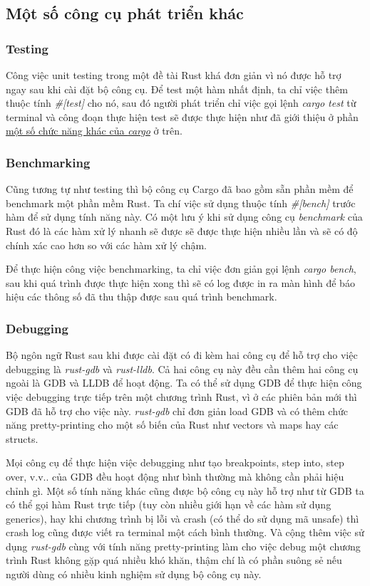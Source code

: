 \subsection{Một số công cụ phát triển khác}
\subsubsection{Testing}
Công việc unit testing trong một đề tài Rust khá đơn giản vì nó được hỗ trợ ngay sau khi cài đặt bộ công cụ.
Để test một hàm nhất định, ta chỉ việc thêm thuộc tính \emph{\#[test]} cho nó, sau đó người phát triển chỉ việc gọi lệnh \emph{cargo test} từ terminal và công đoạn thực hiện test sẽ được thực hiện như đã giới thiệu ở phần \hyperref[lbl:cargo_other_features]{một số chức năng khác của \emph{cargo}} ở trên.
\subsubsection{Benchmarking}
Cũng tương tự như testing thì bộ công cụ Cargo đã bao gồm sẵn phần mềm để benchmark một phần mềm Rust.
Ta chí việc sử dụng thuộc tính \emph{\#[bench]} trước hàm để sử dụng tính năng này.
Có một lưu ý khi sử dụng công cụ \emph{benchmark} của Rust đó là các hàm xử lý nhanh sẽ được sẽ được thực hiện nhiều lần và sẽ có độ chính xác cao hơn so với các hàm xử lý chậm.

Để thực hiện công việc benchmarking, ta chỉ việc đơn giản gọi lệnh \emph{cargo bench}, sau khi quá trình được thực hiện xong thì sẽ có log được in ra màn hình để báo hiệu các thông số đã thu thập được sau quá trình benchmark.
\subsubsection{Debugging} %
Bộ ngôn ngữ Rust sau khi được cài đặt có đi kèm hai công cụ để hỗ trợ cho việc debugging là \emph{rust-gdb} và \emph{rust-lldb}.
Cả hai công cụ này đều cần thêm hai công cụ ngoài là GDB và LLDB để hoạt động.
Ta có thể sử dụng GDB để thực hiện công việc debugging trực tiếp trên một chương trình Rust, vì ở các phiên bản mới thì GDB đã hỗ trợ cho việc này.
\emph{rust-gdb} chỉ đơn giản load GDB và có thêm chức năng pretty-printing cho một số biến của Rust như vectors và maps hay các structs.

Mọi công cụ để thực hiện việc debugging như tạo breakpoints, step into, step over, v.v.. của GDB đều hoạt động như bình thường mà không cần phải hiệu chỉnh gì.
Một số tính năng khác cũng được bộ công cụ này hỗ trợ như từ GDB ta có thể gọi hàm Rust trực tiếp (tuy còn nhiều giới hạn về các hàm sử dụng generics), hay khi chương trình bị lỗi và crash (có thể do sử dụng mã unsafe) thì crash log cũng được viết ra terminal một cách bình thường.
Và cộng thêm việc sử dụng \emph{rust-gdb} cùng với tính năng pretty-printing làm cho việc debug một chương trình Rust không gặp quá nhiều khó khăn, thậm chí là có phần suông sẻ nếu người dùng có nhiều kinh nghiệm sử dụng bộ công cụ này.

